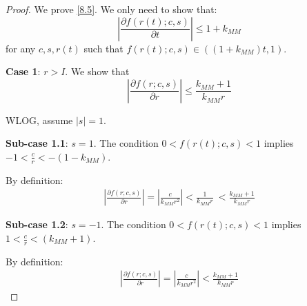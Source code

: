 \documentclass[notitlepage,reqno,11pt]{amsart}
\numberwithin{equation}{section}
\begin{document}
\begin{proof}
    


    We prove \eqref{8.5}. We only need to show that:
    \begin{equation}
        \left|\frac{\partial f(r(t);c,s)}{\partial t} \right| \leq  1 + k_{MM}
    \end{equation}
    for any $c,s, r(t)$ such that $f(r(t);c,s) \in((1+k_{MM}) t,1)$.

    \textbf{Case 1}: $r > I$. We show that
    \begin{equation}
        \left|\frac{\partial f(r;c,s)}{\partial r} \right| \leq  \frac{k_{MM} + 1}{k_{MM}r}
    \end{equation}

    WLOG, assume $|s| = 1$.
    
    \textbf{Sub-case 1.1}: $s = 1$. The condition $0 < f(r(t);c,s) < 1$ implies $-1 < \frac{c}{r} < -(1-k_{MM})$. 

    By definition:
    \begin{align}
        \left|\frac{\partial f(r;c,s)}{\partial r} \right| = \left|\frac{c}{k_{MM}r^2}\right| < \frac{1}{k_{MM}r}\ < \frac{k_{MM} + 1}{k_{MM}r}
    \end{align}

    \textbf{Sub-case 1.2}: $s = -1$. The condition $0 < f(r(t);c,s) < 1$ implies $1 < \frac{c}{r} < (k_{MM} + 1)$. 

    By definition:
    \begin{align}
        \left|\frac{\partial f(r;c,s)}{\partial r} \right| = \left|\frac{c}{k_{MM}r^2}\right| < \frac{k_{MM} + 1}{k_{MM}r}
    \end{align}


\end{proof}
\end{document}
